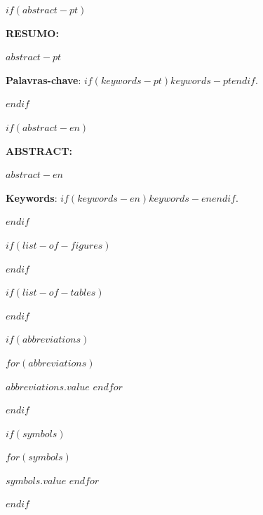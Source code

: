 \documentclass[
  12pt,
  oneside,
  a4paper,
  chapter=TITLE,
  english,
  portuguese
]{abntex2}
\begin{document}
$if(abstract-pt)$
\newpage
\thispagestyle{empty}
\begin{resumoumacoluna}
\noindent\textbf{RESUMO:}\vspace{\onelineskip}

$abstract-pt$

\vspace{\onelineskip}
\noindent\textbf{Palavras-chave}: $if(keywords-pt)$$keywords-pt$$endif$.
\end{resumoumacoluna}
\clearpage
$endif$

$if(abstract-en)$
\newpage
\thispagestyle{empty}
\renewcommand{\resumoname}{Abstract}
\begin{resumoumacoluna}
\noindent\textbf{ABSTRACT:}\vspace{\onelineskip}

$abstract-en$

\vspace{\onelineskip}
\noindent\textbf{Keywords}: $if(keywords-en)$$keywords-en$$endif$.
\end{resumoumacoluna}
\clearpage
$endif$

$if(list-of-figures)$
\listoffigures*
\cleardoublepage
$endif$

$if(list-of-tables)$
\listoftables*
\cleardoublepage
$endif$

$if(abbreviations)$
\begin{siglas}
$for(abbreviations)$
  \item[$abbreviations.key$] $abbreviations.value$
$endfor$
\end{siglas}
$endif$

$if(symbols)$
\begin{simbolos}
$for(symbols)$
  \item[$symbols.key$] $symbols.value$
$endfor$
\end{simbolos}
$endif$
\end{document}
